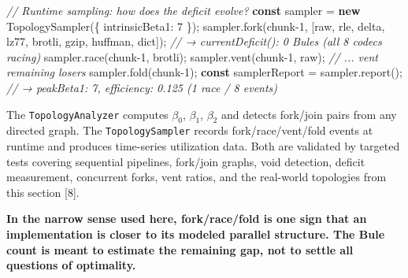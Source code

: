 \documentclass[
  11pt,
]{article}
\newenvironment{Shaded}{}{}
\newcommand{\CommentTok}[1]{\textcolor[rgb]{0.38,0.63,0.69}{\textit{#1}}}
\newcommand{\DecValTok}[1]{\textcolor[rgb]{0.25,0.63,0.44}{#1}}
\newcommand{\FunctionTok}[1]{\textcolor[rgb]{0.02,0.16,0.49}{#1}}
\newcommand{\KeywordTok}[1]{\textcolor[rgb]{0.00,0.44,0.13}{\textbf{#1}}}
\newcommand{\NormalTok}[1]{#1}
\newcommand{\OperatorTok}[1]{\textcolor[rgb]{0.40,0.40,0.40}{#1}}
\newcommand{\StringTok}[1]{\textcolor[rgb]{0.25,0.44,0.63}{#1}}
\begin{document}
\begin{Shaded}
\begin{Highlighting}[]
\CommentTok{// Runtime sampling: how does the deficit evolve?}
\KeywordTok{const}\NormalTok{ sampler }\OperatorTok{=} \KeywordTok{new} \FunctionTok{TopologySampler}\NormalTok{(\{ intrinsicBeta1}\OperatorTok{:} \DecValTok{7}\NormalTok{ \})}\OperatorTok{;}
\NormalTok{sampler}\OperatorTok{.}\FunctionTok{fork}\NormalTok{(}\StringTok{\textquotesingle{}chunk{-}1\textquotesingle{}}\OperatorTok{,}\NormalTok{ [}\StringTok{\textquotesingle{}raw\textquotesingle{}}\OperatorTok{,} \StringTok{\textquotesingle{}rle\textquotesingle{}}\OperatorTok{,} \StringTok{\textquotesingle{}delta\textquotesingle{}}\OperatorTok{,} \StringTok{\textquotesingle{}lz77\textquotesingle{}}\OperatorTok{,} \StringTok{\textquotesingle{}brotli\textquotesingle{}}\OperatorTok{,} \StringTok{\textquotesingle{}gzip\textquotesingle{}}\OperatorTok{,} \StringTok{\textquotesingle{}huffman\textquotesingle{}}\OperatorTok{,} \StringTok{\textquotesingle{}dict\textquotesingle{}}\NormalTok{])}\OperatorTok{;}
\CommentTok{// → currentDeficit(): 0 Bules (all 8 codecs racing)}
\NormalTok{sampler}\OperatorTok{.}\FunctionTok{race}\NormalTok{(}\StringTok{\textquotesingle{}chunk{-}1\textquotesingle{}}\OperatorTok{,} \StringTok{\textquotesingle{}brotli\textquotesingle{}}\NormalTok{)}\OperatorTok{;}
\NormalTok{sampler}\OperatorTok{.}\FunctionTok{vent}\NormalTok{(}\StringTok{\textquotesingle{}chunk{-}1\textquotesingle{}}\OperatorTok{,} \StringTok{\textquotesingle{}raw\textquotesingle{}}\NormalTok{)}\OperatorTok{;}
\CommentTok{// ... vent remaining losers}
\NormalTok{sampler}\OperatorTok{.}\FunctionTok{fold}\NormalTok{(}\StringTok{\textquotesingle{}chunk{-}1\textquotesingle{}}\NormalTok{)}\OperatorTok{;}
\KeywordTok{const}\NormalTok{ samplerReport }\OperatorTok{=}\NormalTok{ sampler}\OperatorTok{.}\FunctionTok{report}\NormalTok{()}\OperatorTok{;}
\CommentTok{// → peakBeta1: 7, efficiency: 0.125 (1 race / 8 events)}
\end{Highlighting}
\end{Shaded}

The \texttt{TopologyAnalyzer} computes \(\beta_0\), \(\beta_1\),
\(\beta_2\) and detects fork/join pairs from any directed graph. The
\texttt{TopologySampler} records fork/race/vent/fold events at runtime
and produces time-series utilization data. Both are validated by
targeted tests covering sequential pipelines, fork/join graphs, void
detection, deficit measurement, concurrent forks, vent ratios, and the
real-world topologies from this section {[}8{]}.

\textbf{In the narrow sense used here, fork/race/fold is one sign that
an implementation is closer to its modeled parallel structure. The Bule
count is meant to estimate the remaining gap, not to settle all
questions of optimality.}
\end{document}
